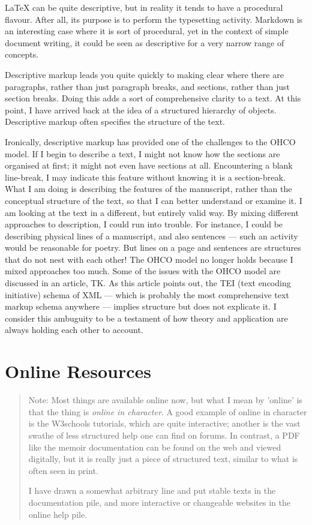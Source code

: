 \documentclass[11pt, oneside]{memoir}
\begin{document}
\LaTeX{} can be quite descriptive, but in reality it tends to have a procedural flavour. After all, its purpose is to perform the typesetting activity. Markdown is an interesting case where it is sort of procedural, yet in the context of simple document writing, it could be seen as descriptive for a very narrow range of concepts.

Descriptive markup leads you quite quickly to making clear where there are paragraphs, rather than just paragraph breaks, and sections, rather than just section breaks. Doing this adds a sort of comprehensive clarity to a text. At this point, I have arrived back at the idea of a structured hierarchy of objects. Descriptive markup often specifies the structure of the text. 

Ironically, descriptive markup has provided one of the challenges to the OHCO model. If I begin to describe a text, I might not know how the sections are organised at first; it might not even have sections at all. Encountering a blank line-break, I may indicate this feature without knowing it is a section-break. What I am doing is describing the features of the manuscript, rather than the conceptual structure of the text, so that I can better understand or examine it. I am looking at the text in a different, but entirely valid way. By mixing different approaches to description, I could run into trouble. For instance, I could be describing physical lines of a manuscript, and also sentences — such an activity would be reasonable for poetry. But lines on a page and sentences are structures that do not nest with each other! The OHCO model no longer holds because I mixed approaches too much. Some of the issues with the OHCO model are discussed in an article, TK. As this article points out, the TEI (text encoding initiative) schema of XML — which is probably the most comprehensive text markup schema anywhere — implies structure but does not explicate it. I consider this ambuguity to be a testament of how theory and application are always holding each other to account.

\chapter{Online Resources}

\begin{quotation}
    Note: Most things are available online now, but what I mean by 'online' is that the thing is \emph{online in character}. A good example of online in character is the W3schools tutorials, which are quite interactive; another is the vast swathe of less structured help one can find on forums. In contrast, a PDF like the memoir documentation can be found on the web and viewed digitally, but it is really just a piece of structured text, similar to what is often seen in print.

I have drawn a somewhat arbitrary line and put stable texts in the documentation pile, and more interactive or changeable websites in the online help pile.
\end{quotation}
\end{document}
